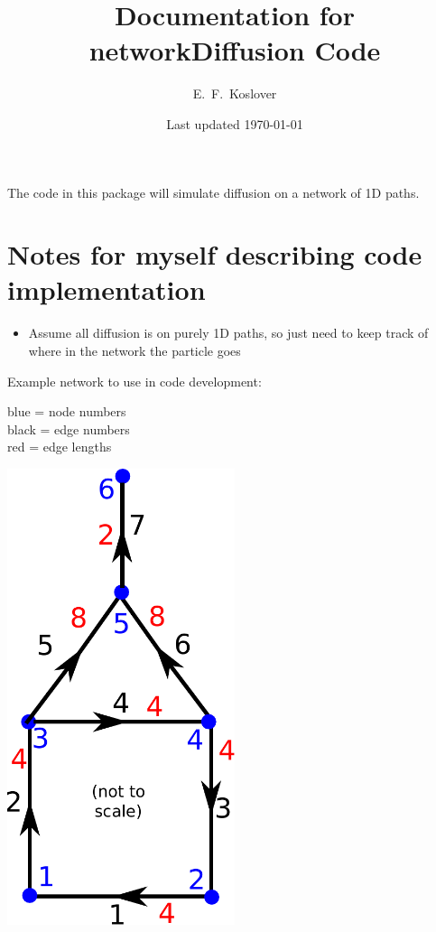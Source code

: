 \documentclass[12pt]{article}
\begin{document}
\title{\vspace{-2cm}Documentation for networkDiffusion Code}
\author{E.~F.~Koslover}
\date{Last updated \today}
\maketitle

The code in this package will simulate diffusion on a network of 1D paths.


\section*{Notes for myself describing code implementation}

\begin{itemize}
	\item Assume all diffusion is on purely 1D paths, so just need to keep track of where in the network the particle goes	
\end{itemize}

\begin{minipage}{0.5\textwidth}
Example network to use in code development:

{\color{blue} blue} = node numbers \\
black = edge numbers \\
{\color{red} red} = edge lengths

\end{minipage}
\begin{minipage}{0.2\textwidth}
	\end{minipage}
\begin{minipage}{0.3\textwidth}
\centerline{\includegraphics[width=0.5\textwidth]{example1network.pdf}}
\end{minipage}
\end{document}
